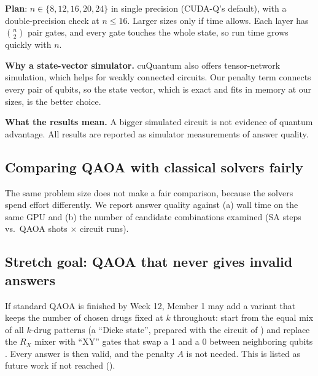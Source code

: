 \textbf{Plan}: $n\in\{8,12,16,20,24\}$ in single precision (CUDA-Q's default), with a double-precision check at $n\le 16$. Larger sizes only if time allows. Each layer has $\binom{n}{2}$ pair gates, and every gate touches the whole state, so run time grows quickly with $n$.

\textbf{Why a state-vector simulator.} cuQuantum also offers tensor-network simulation, which helps for weakly connected circuits. Our penalty term connects every pair of qubits, so the state vector, which is exact and fits in memory at our sizes, is the better choice.

\textbf{What the results mean.} A bigger simulated circuit is not evidence of quantum advantage. All results are reported as simulator measurements of answer quality.

\subsection{Comparing QAOA with classical solvers fairly}

The same problem size does not make a fair comparison, because the solvers spend effort differently. We report answer quality against (a) wall time on the same GPU and (b) the number of candidate combinations examined (SA steps vs.\ QAOA shots $\times$ circuit runs).

\subsection{Stretch goal: QAOA that never gives invalid answers}

If standard QAOA is finished by Week 12, Member 1 may add a variant that keeps the number of chosen drugs fixed at $k$ throughout: start from the equal mix of all $k$-drug patterns (a ``Dicke state'', prepared with the circuit of \cite{bartschi2019dicke}) and replace the $R_X$ mixer with ``XY'' gates that swap a 1 and a 0 between neighboring qubits \cite{hadfield2019qaoa,wang2020xy,cook2020kvertex}. Every answer is then valid, and the penalty $A$ is not needed. This is listed as future work if not reached ().
